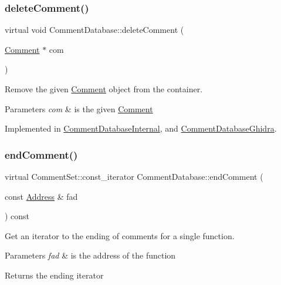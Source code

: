 \subsubsection{\texorpdfstring{deleteComment()}{deleteComment()}}
{\footnotesize\ttfamily virtual void Comment\+Database\+::delete\+Comment (\begin{DoxyParamCaption}\item[{\mbox{\hyperlink{class_comment}{Comment}} $\ast$}]{com }\end{DoxyParamCaption})\hspace{0.3cm}{\ttfamily [pure virtual]}}



Remove the given \mbox{\hyperlink{class_comment}{Comment}} object from the container. 


\begin{DoxyParams}{Parameters}
{\em com} & is the given \mbox{\hyperlink{class_comment}{Comment}} \\
\hline
\end{DoxyParams}


Implemented in \mbox{\hyperlink{class_comment_database_internal_a623dac65760a7c7a328c652f34ee714a}{Comment\+Database\+Internal}}, and \mbox{\hyperlink{class_comment_database_ghidra_a988787294b6b5657f7b895d0f8ecce92}{Comment\+Database\+Ghidra}}.

\mbox{\label{class_comment_database_a51e0634dc24c921507426298910336f4}} 
\subsubsection{\texorpdfstring{endComment()}{endComment()}}
{\footnotesize\ttfamily virtual Comment\+Set\+::const\+\_\+iterator Comment\+Database\+::end\+Comment (\begin{DoxyParamCaption}\item[{const \mbox{\hyperlink{class_address}{Address}} \&}]{fad }\end{DoxyParamCaption}) const\hspace{0.3cm}{\ttfamily [pure virtual]}}



Get an iterator to the ending of comments for a single function. 


\begin{DoxyParams}{Parameters}
{\em fad} & is the address of the function \\
\hline
\end{DoxyParams}
\begin{DoxyReturn}{Returns}
the ending iterator 
\end{DoxyReturn}


